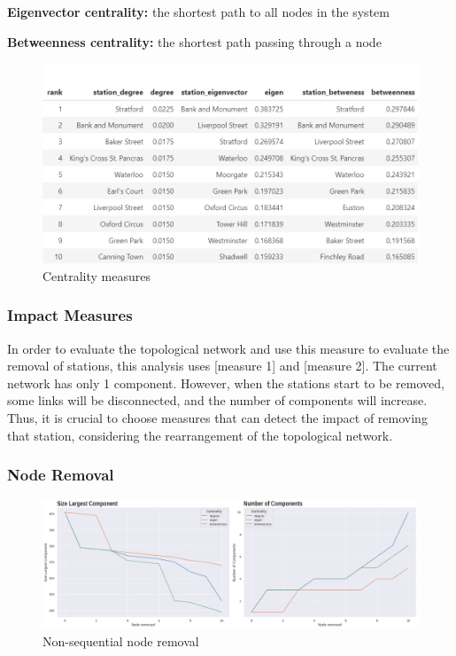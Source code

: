 \documentclass[10pt]{report}
\numberwithin{figure}{section}
\numberwithin{table}{section}
\begin{document}
        \textbf{Eigenvector centrality:}  the shortest path to all nodes in the system

   \vspace{5mm} %
   
        \textbf{Betweenness centrality:} the shortest path passing through a node

    \begin{figure}[htp]
        \centering
        \includegraphics[width=14cm]{Image/Table_CentralitiesMeasures.png}
        \caption{Centrality measures}
        \label{fig:galaxy}
    \end{figure}

\subsubsection{Impact Measures} 

In order to evaluate the topological network and use this measure to evaluate the removal of stations, this analysis uses [measure 1] and [measure 2]. The current network has only 1 component. However, when the stations start to be removed, some links will be disconnected, and the number of components will increase. Thus, it is crucial to choose measures that can detect the impact of removing that station, considering the rearrangement of the topological network. 

\subsubsection{Node Removal} 

    \begin{figure}[htp]
        \centering
        \includegraphics[width=16cm]{Image/Part1_nonsequential_Summarise.png}
        \caption{Non-sequential node removal}
        \label{fig:galaxy}
    \end{figure}
\end{document}
